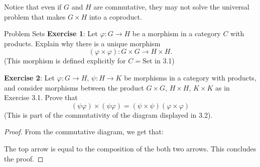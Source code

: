 \documentclass{report}
\begin{document}
Notice that even if $G$ and $H$ are commutative, they may not solve the universal problem that makes $G \times H$ into a coproduct.

\begin{exercises}{Problem Sets}
    \textbf{Exercise 1}: Let $\varphi: G \rightarrow H$ be a morphism in a category $C$ with products. Explain why there is a unique morphism
        \begin{equation*}
            (\varphi \times \varphi) : G \times G \rightarrow H \times H.
        \end{equation*}
    (This morphism is defined explicitly for $C = \text{Set}$ in 3.1)

    \textbf{Exercise 2}: Let $\varphi: G \rightarrow H$, $\psi : H \rightarrow K$ be morphisms in a category with products, and consider morphisms between the product $G \times G$, $H \times H$, $K \times K$ as in Exercise 3.1. Prove that
        \begin{equation*}
            (\psi\varphi) \times (\psi\varphi) = (\psi \times \psi)(\varphi \times \varphi)
        \end{equation*}
    (This is part of the commutativity of the diagram displayed in 3.2).
        \begin{proof}
            From the commutative diagram, we get that:
                \begin{center}
                \end{center}
            The top arrow is equal to the composition of the both two arrows. This concludes the proof.
        \end{proof}


\end{exercises}
\end{document}
